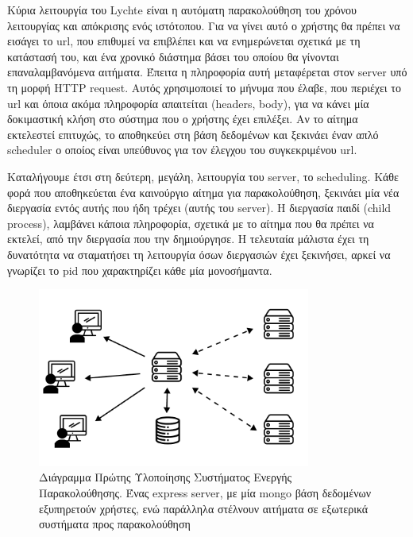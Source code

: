 Κύρια λειτουργία του Lychte είναι η αυτόματη παρακολούθηση του χρόνου λειτουργίας και απόκρισης ενός ιστότοπου.
Για να γίνει αυτό ο χρήστης θα πρέπει να εισάγει το url, που επιθυμεί να επιβλέπει και να ενημερώνεται σχετικά με
τη κατάστασή του, και ένα χρονικό διάστημα βάσει του οποίου θα γίνονται επαναλαμβανόμενα αιτήματα.
Έπειτα η πληροφορία αυτή μεταφέρεται στον server υπό τη μορφή HTTP request. Αυτός χρησιμοποιεί το μήνυμα που έλαβε, που περιέχει το url και
όποια ακόμα πληροφορία απαιτείται (headers, body), για να κάνει μία δοκιμαστική κλήση στο σύστημα που ο χρήστης έχει επιλέξει. Αν το αίτημα εκτελεστεί επιτυχώς,
το αποθηκεύει στη βάση δεδομένων και ξεκινάει έναν απλό scheduler
ο οποίος είναι υπεύθυνος για τον έλεγχου του συγκεκριμένου url.

Καταλήγουμε έτσι στη δεύτερη, μεγάλη, λειτουργία του server, το scheduling. Κάθε φορά που αποθηκεύεται ένα καινούργιο
αίτημα για παρακολούθηση, ξεκινάει μία νέα διεργασία εντός αυτής που ήδη τρέχει (αυτής του server). Η διεργασία παιδί (child process),
λαμβάνει κάποια πληροφορία, σχετικά με το αίτημα που θα πρέπει να εκτελεί, από την διεργασία που την δημιούργησε. Η τελευταία μάλιστα
έχει τη δυνατότητα να σταματήσει τη λειτουργία όσων διεργασιών έχει ξεκινήσει, αρκεί να γνωρίζει το pid που χαρακτηρίζει κάθε μία μονοσήμαντα.

\begin{figure}[!ht]
	\centering
	\includegraphics[width=0.8\textwidth]{./images/chapter4/lychte-first-implementation.png}
	\caption[Διάγραμμα πρώτης Υλοποίησης]{Διάγραμμα Πρώτης Υλοποίησης Συστήματος Ενεργής Παρακολούθησης. Ένας express server, με μία mongo βάση δεδομένων εξυπηρετούν χρήστες, ενώ παράλληλα στέλνουν αιτήματα σε εξωτερικά συστήματα προς παρακολούθηση}
	\label{fig:first_implementation}
\end{figure}

